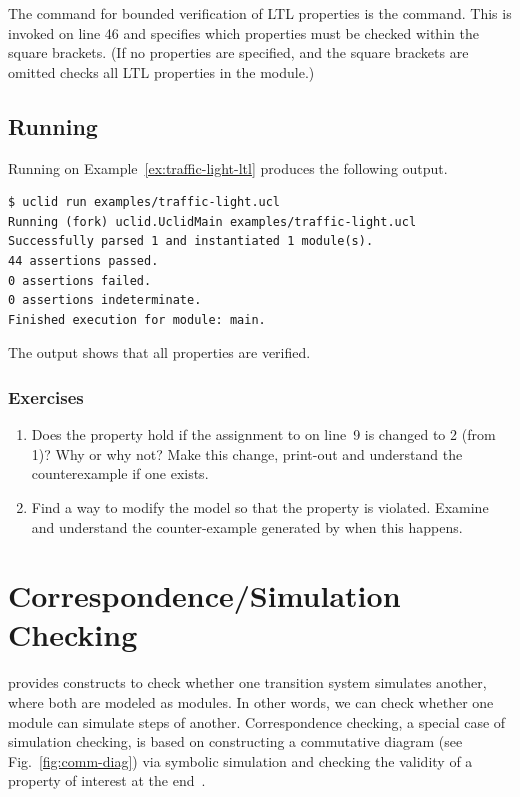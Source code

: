 The command for bounded verification of LTL properties is the  command. This is invoked on line 46 and specifies which properties must be checked within the square brackets. (If no properties are specified, and the square brackets are omitted  checks all LTL properties in the module.)

\subsection{Running \uclid{}}
Running \uclid{} on Example~\ref{ex:traffic-light-ltl} produces the following output.
\begin{Verbatim}[frame=single, samepage=true]
$ uclid run examples/traffic-light.ucl
Running (fork) uclid.UclidMain examples/traffic-light.ucl
Successfully parsed 1 and instantiated 1 module(s).
44 assertions passed.
0 assertions failed.
0 assertions indeterminate.
Finished execution for module: main.
\end{Verbatim}

The output shows that all properties are verified.

\subsubsection{Exercises}
\begin{enumerate}
    \item Does the property  hold if the assignment to  on line~9 is changed to 2 (from 1)? Why or why not? Make this change, print-out and understand the counterexample if one exists.

    \item Find a way to modify the model so that the property  is violated. Examine and understand the counter-example generated by \uclid{} when this happens.
\end{enumerate}

\section{Correspondence/Simulation Checking}

\uclid{} provides constructs to check whether one transition system
simulates another, where both are
modeled as \uclid{} modules. In other words, we can check
whether one module can simulate steps of another.
Correspondence checking, a special case of simulation checking,
is based on constructing a commutative diagram (see Fig.~\ref{fig:comm-diag}) via symbolic simulation and checking the validity of a property
of interest at the end~\cite{burch-cav94}. 

